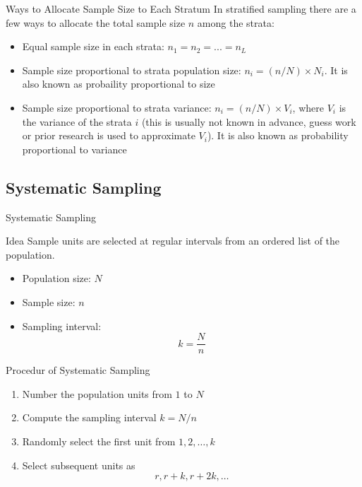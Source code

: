 \documentclass[12pt, aspectratio=169]{beamer}
\begin{document}
    
    \begin{frame}{Ways to Allocate Sample Size to Each Stratum}
        In stratified sampling there are a few ways to allocate the total sample size \(n\) among the strata:
        \begin{itemize}
            \item Equal sample size in each strata: \(n_1 = n_2 = ... = n_L\)
            \item Sample size proportional to strata population size: \(n_i = (n/N) \times N_i\). It is also known as probaility proportional to size
            \item Sample size proportional to strata variance: \(n_i = (n/N) \times V_i\), where \(V_i\) is the variance of the strata \(i\) (this is usually not known in advance, guess work or prior research is used to approximate \(V_i\)). It is also known as probability proportional to variance
        \end{itemize}
    \end{frame}


    \subsection{Systematic Sampling}

    \begin{frame}{Systematic Sampling}
        \begin{block}{Idea}
            Sample units are selected at regular intervals from an ordered list of the population.
        \end{block}

        \begin{itemize}
            \item Population size: $N$

            \item Sample size: $n$

            \item Sampling interval:
            \[
                k = \frac{N}{n}
            \]
        \end{itemize}
    \end{frame}


    \begin{frame}{Procedur of Systematic Sampling}
        \begin{enumerate}
            \item Number the population units from $1$ to $N$

            \item Compute the sampling interval $k = N/n$

            \item Randomly select the first unit from $1,2,\dots,k$

            \item Select subsequent units as
            \[
                r, r+k, r+2k, \dots
            \]
        \end{enumerate}
    \end{frame}
\end{document}
